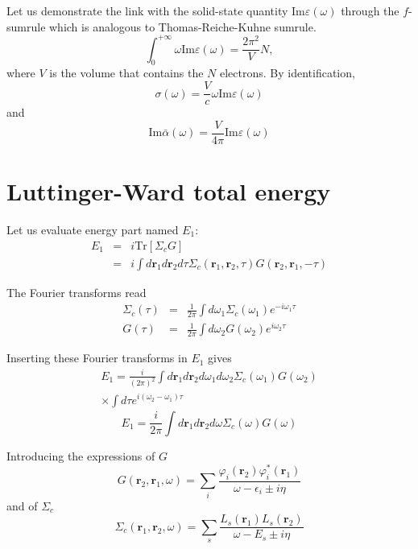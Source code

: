 \documentclass[aps,prb,reprint,showpacs]{revtex4-1}
\def\br{\mathbf{r}}
\begin{document}
Let us demonstrate the link with the solid-state quantity $\mathrm{Im} \varepsilon(\omega)$
through the $f$-sumrule which is analogous to Thomas-Reiche-Kuhne sumrule.
\begin{equation}
 \int_0^{+\infty} \omega \mathrm{Im}\varepsilon(\omega) = \frac{2\pi^2}{V} N ,
\end{equation}
where $V$ is the volume that contains the $N$ electrons.
By identification, 
\begin{equation}
 \sigma(\omega) = \frac{V}{c} \omega \mathrm{Im}\varepsilon(\omega)
\end{equation}
and
\begin{equation}
 \mathrm{Im} \bar\alpha(\omega) = \frac{V}{4\pi} \mathrm{Im}\varepsilon(\omega)
\end{equation}







\section{Luttinger-Ward total energy}

Let us evaluate energy part named $E_1$:
\begin{eqnarray}
 E_1 & = & i\text{Tr} \left[ \Sigma_c G \right]  \\
     & = & i\int d\br_1 d\br_2 d \tau \Sigma_c(\br_1,\br_2,\tau) G(\br_2,\br_1,-\tau)
\end{eqnarray}

The Fourier transforms read
\begin{eqnarray}
 \Sigma_c(\tau) & = & \frac{1}{2\pi} \int d\omega_1 \Sigma_c(\omega_1) e^{-i\omega_1 \tau}   \\
       G (\tau) & = & \frac{1}{2\pi} \int d\omega_2        G(\omega_2) e^{ i\omega_2 \tau}
\end{eqnarray}

Inserting these Fourier transforms in $E_1$ gives
\begin{multline}
 E_1 = \frac{i}{(2\pi)^2} \int d\br_1 d\br_2 d\omega_1 d\omega_2 \Sigma_c(\omega_1) G(\omega_2) \\
        \times \int d\tau e^{i(\omega_2-\omega_1)\tau}
\end{multline}
\begin{equation}
 E_1 = \frac{i}{2\pi} \int d\br_1 d\br_2 d\omega \Sigma_c(\omega) G(\omega)
\end{equation}

Introducing the expressions of $G$
\begin{equation}
 G(\br_2,\br_1,\omega) = \sum_i \frac{\varphi_i(\br_2) \varphi_i^*(\br_1)}
                                     {\omega - \epsilon_i \pm i\eta}
\end{equation}
and of $\Sigma_c$
\begin{equation}
 \Sigma_c(\br_1,\br_2,\omega) = \sum_s \frac{ L_s(\br_1) L_s(\br_2) }
                                            { \omega - E_s \pm i\eta }
\end{equation}
\end{document}
